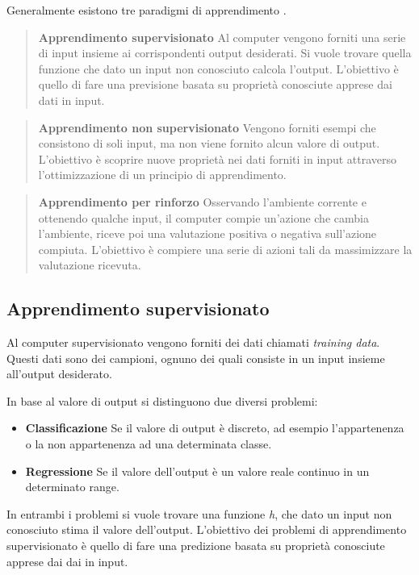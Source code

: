 \documentclass[../main.tex]{subfiles}
\begin{document}
Generalmente esistono tre paradigmi di apprendimento \cite{ai}.

\begin{verse}
				\textbf{Apprendimento supervisionato} Al computer vengono forniti una serie di input insieme ai corrispondenti output desiderati. Si vuole trovare quella funzione che dato un input non conosciuto calcola l'output. L'obiettivo è quello di fare una previsione basata su proprietà conosciute apprese dai dati in input.
\end{verse}

\begin{verse}
				\textbf{Apprendimento non supervisionato} Vengono forniti esempi che consistono di soli input, ma non viene fornito alcun valore di output. L'obiettivo è scoprire nuove proprietà nei dati forniti in input attraverso l'ottimizzazione di un principio di apprendimento.
\end{verse}

\begin{verse}
				\textbf{Apprendimento per rinforzo} Osservando l'ambiente corrente e ottenendo qualche input, il computer compie un'azione che cambia l'ambiente, riceve poi una valutazione positiva o negativa sull'azione compiuta. L'obiettivo è compiere una serie di azioni tali da massimizzare la valutazione ricevuta.
\end{verse}

\subsection{Apprendimento supervisionato}
Al computer supervisionato vengono forniti dei dati chiamati \textit{training data}. Questi dati sono dei campioni, ognuno dei quali consiste in un input insieme all'output desiderato.

In base al valore di output si distinguono due diversi problemi:

\begin{itemize}
				\item \textbf{Classificazione} Se il valore di output è discreto, ad esempio l'appartenenza o la non appartenenza ad una determinata classe.
				\item \textbf{Regressione} Se il valore dell'output è un valore reale continuo in un determinato range.
\end{itemize}

In entrambi i problemi si vuole trovare una funzione \textit{h}, che dato un input non conosciuto stima il valore dell'output. L'obiettivo dei problemi di apprendimento supervisionato è quello di fare una predizione basata su proprietà conosciute apprese dai dai in input.
\end{document}

